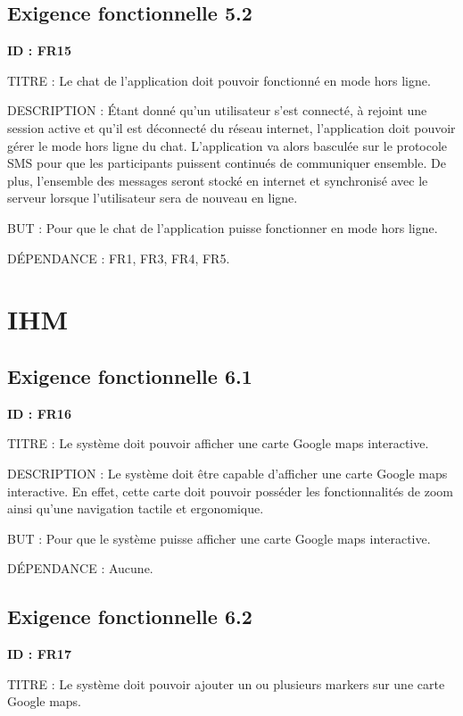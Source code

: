 \documentclass[titlepage, 12pt]{report}
\begin{document}
\subsection{Exigence fonctionnelle 5.2}

\textbf{ID : FR15}

TITRE : Le chat de l'application doit pouvoir fonctionné en mode hors ligne.

DESCRIPTION : Étant donné qu'un utilisateur s'est connecté, à rejoint une session active et qu'il est déconnecté du réseau internet, l'application doit pouvoir gérer le mode hors ligne du chat. L'application va alors basculée sur le protocole SMS pour que les participants puissent continués de communiquer ensemble. De plus, l'ensemble des messages seront stocké en internet et synchronisé avec le serveur lorsque l'utilisateur sera de nouveau en ligne.

BUT : Pour que le chat de l'application puisse fonctionner en mode hors ligne.

DÉPENDANCE : FR1, FR3, FR4, FR5.

\section{IHM}

\subsection{Exigence fonctionnelle 6.1}

\textbf{ID : FR16}

TITRE : Le système doit pouvoir afficher une carte Google maps interactive.

DESCRIPTION : Le système doit être capable d'afficher une carte Google maps interactive. En effet, cette carte doit pouvoir posséder les fonctionnalités de zoom ainsi qu'une navigation tactile et ergonomique.

BUT : Pour que le système puisse afficher une carte Google maps interactive.

DÉPENDANCE : Aucune.

\subsection{Exigence fonctionnelle 6.2}

\textbf{ID : FR17}

TITRE : Le système doit pouvoir ajouter un ou plusieurs markers sur une carte Google maps.
\end{document}
